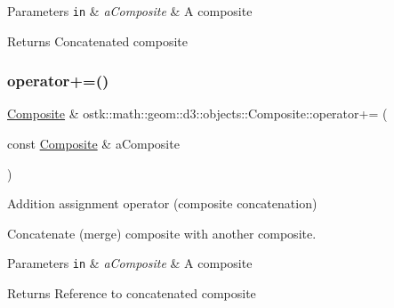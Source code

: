 \begin{DoxyParams}[1]{Parameters}
\mbox{\tt in}  & {\em a\+Composite} & A composite \\
\hline
\end{DoxyParams}
\begin{DoxyReturn}{Returns}
Concatenated composite 
\end{DoxyReturn}
\mbox{\label{classostk_1_1math_1_1geom_1_1d3_1_1objects_1_1_composite_aca2c415b82aee0b6acfae16675f1391e}} 
\subsubsection{\texorpdfstring{operator+=()}{operator+=()}}
{\footnotesize\ttfamily \hyperlink{classostk_1_1math_1_1geom_1_1d3_1_1objects_1_1_composite}{Composite} \& ostk\+::math\+::geom\+::d3\+::objects\+::\+Composite\+::operator+= (\begin{DoxyParamCaption}\item[{const \hyperlink{classostk_1_1math_1_1geom_1_1d3_1_1objects_1_1_composite}{Composite} \&}]{a\+Composite }\end{DoxyParamCaption})}



Addition assignment operator (composite concatenation) 

Concatenate (merge) composite with another composite.


\begin{DoxyParams}[1]{Parameters}
\mbox{\tt in}  & {\em a\+Composite} & A composite \\
\hline
\end{DoxyParams}
\begin{DoxyReturn}{Returns}
Reference to concatenated composite 
\end{DoxyReturn}
\mbox{\label{classostk_1_1math_1_1geom_1_1d3_1_1objects_1_1_composite_a0e0a4a03302ae92926d8f4a94a3b1291}} 
